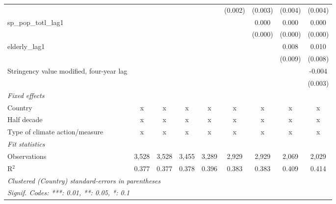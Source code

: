\begin{tabular}{lcccccccc}
                                                                  &               &               &               &              & (0.002)      & (0.003)      & (0.004)     & (0.004)\\   
   sp\_pop\_totl\_lag1                                            &               &               &               &              &              & 0.000        & 0.000       & 0.000\\   
                                                                  &               &               &               &              &              & (0.000)      & (0.000)     & (0.000)\\   
   elderly\_lag1                                                  &               &               &               &              &              &              & 0.008       & 0.010\\   
                                                                  &               &               &               &              &              &              & (0.009)     & (0.008)\\   
   Stringency value modified, four-year lag                       &               &               &               &              &              &              &             & -0.004\\   
                                                                  &               &               &               &              &              &              &             & (0.003)\\   
   \emph{Fixed effects}\\
   Country                                                        & x             & x             & x             & x            & x            & x            & x           & x\\  
   Half decade                                                    & x             & x             & x             & x            & x            & x            & x           & x\\  
   Type of climate action/measure                                 & x             & x             & x             & x            & x            & x            & x           & x\\  
   \midrule \emph{Fit statistics}\\
   Observations                                                   & 3,528         & 3,528         & 3,455         & 3,289        & 2,929        & 2,929        & 2,069       & 2,029\\  
   R$^2$                                                          & 0.377         & 0.377         & 0.378         & 0.396        & 0.383        & 0.383        & 0.409       & 0.414\\  
   \midrule
   \multicolumn{9}{l}{\emph{Clustered (Country) standard-errors in parentheses}}\\
   \multicolumn{9}{l}{\emph{Signif. Codes: ***: 0.01, **: 0.05, *: 0.1}}\\
\end{tabular}
\par\endgroup


